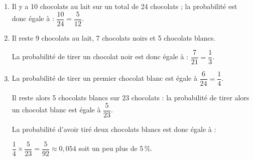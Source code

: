 
\medskip

%
%

\begin{enumerate}
\item %
Il y a 10 chocolats au lait sur un total de 24 chocolats ; la probabilité est donc égale à : $\dfrac{10}{24} = \dfrac{5}{12}$.
\item %
Il reste 9 chocolats au lait, 7 chocolats noirs et 5 chocolats blancs.

La probabilité de tirer un chocolat noir est donc égale à : $\dfrac{7}{21} = \dfrac{1}{3}$.
\item %

La probabilité de tirer un premier chocolat blanc est égale à $\dfrac{6}{24} = \dfrac{1}{4}$.

Il reste alors 5 chocolats blancs sur 23 chocolats : la probabilité de tirer alors un chocolat blanc est égale à $\dfrac{5}{23}$.

La probabilité d’avoir tiré deux chocolats blancs est donc égale à :

$\dfrac{1}{4} \times \dfrac{5}{23} = \dfrac{5}{92} \approx 0,054$ soit un peu plus de 5\,\%.
\end{enumerate}

\vspace{0,5cm}

